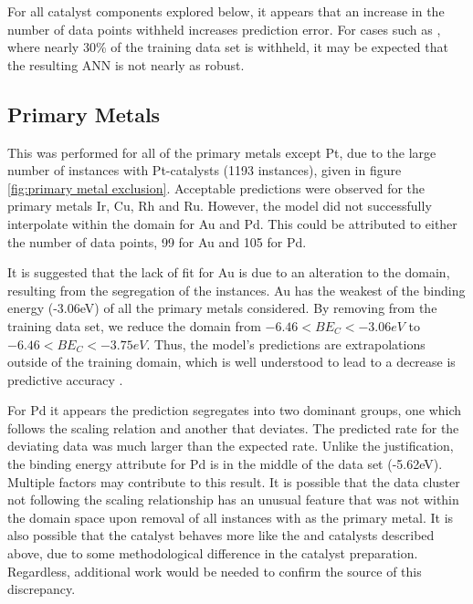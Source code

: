 For all catalyst components explored below, it appears that an increase in the number of data points withheld increases prediction error. For cases such as , where nearly 30\% of the training data set is withheld, it may be expected that the resulting ANN is not nearly as robust.

	\subsection{Primary Metals}
	This was performed for all of the primary metals except Pt, due to the large number of instances with Pt-catalysts (1193 instances), given in figure \ref{fig:primary metal exclusion}. Acceptable predictions were observed for the primary metals Ir, Cu, Rh and Ru. However, the model did not successfully interpolate within the domain for Au and Pd. This could be attributed to either the number of data points, 99 for Au and 105 for Pd. 

	It is suggested that the lack of fit for Au is due to an alteration to the domain, resulting from the segregation of the  instances. Au has the weakest of the binding energy (-3.06eV) of all the primary metals considered. By removing  from the training data set, we reduce the domain from  $-6.46 < BE_C < -3.06 eV$ to $-6.46 < BE_C < -3.75 eV$. Thus, the model's predictions are extrapolations outside of the training domain, which is well understood to lead to a decrease is predictive accuracy \cite{Corma_2003_2}. 

	For Pd it appears the prediction segregates into two dominant groups, one which follows the scaling relation and another that deviates. The predicted rate for the deviating data was much larger than the expected rate. Unlike the  justification, the binding energy attribute for Pd is in the middle of the data set (-5.62eV). Multiple factors may contribute to this result. It is possible that the data cluster not following the scaling relationship has an unusual feature that was not within the domain space upon removal of all instances with  as the primary metal. It is also possible that the catalyst behaves more like the  and  catalysts described above, due to some methodological difference in the catalyst preparation. Regardless, additional work would be needed to confirm the source of this discrepancy. 

